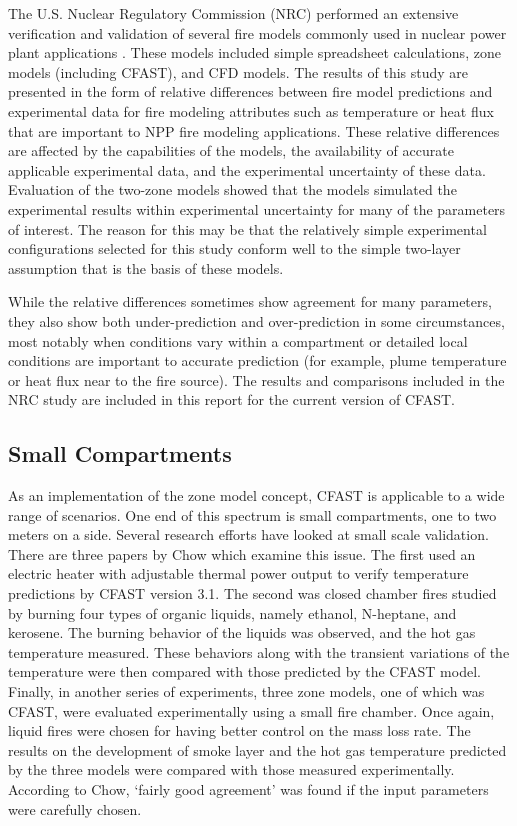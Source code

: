 The U.S. Nuclear Regulatory Commission (NRC) performed an extensive verification and validation of several fire models commonly used in nuclear power plant applications \cite{NRCNUREG1824}.  These models included simple spreadsheet calculations, zone models (including CFAST), and CFD models. The results of this study are presented in the form of relative differences between fire model predictions and experimental data for fire modeling attributes such as temperature or heat flux that are important to NPP fire modeling applications.  These relative differences are affected by the capabilities of the models, the availability of accurate applicable experimental data, and the experimental uncertainty of these data. Evaluation of the two-zone models showed that the models simulated the experimental results within experimental uncertainty  for many of the parameters of interest. The reason for this may be that the relatively simple experimental configurations selected for this study conform well to the simple two-layer assumption that is the basis of these models.

While the relative differences sometimes show agreement for many parameters, they also show both under-prediction and over-prediction in some circumstances, most notably when conditions vary within a compartment or detailed local conditions are important to accurate prediction (for example, plume temperature or heat flux near to the fire source). The results and comparisons included in the NRC study are included in this report for the current version of CFAST.

\subsection{Small Compartments}

As an implementation of the zone model concept, CFAST is applicable to a wide range of scenarios. One end of this spectrum is small compartments, one to two meters on a side. Several research efforts have looked at small scale validation. There are three papers by Chow \cite{Lui:2003,Chow:1995,Chow:1992} which examine this issue. The first used an electric heater with adjustable thermal power output to verify temperature predictions by CFAST version 3.1. The second was closed chamber fires studied by burning four types of organic liquids, namely ethanol, N-heptane, and kerosene. The burning behavior of the liquids was observed, and the hot gas temperature measured. These behaviors along with the transient variations of the temperature were then compared with those predicted by the CFAST model. Finally, in another series of experiments, three zone models, one of which was CFAST, were evaluated experimentally using a small fire chamber. Once again, liquid fires were chosen for having better control on the mass loss rate. The results on the development of smoke layer and the hot gas temperature predicted by the three models were compared with those measured experimentally. According to Chow, `fairly good agreement' was found if the input parameters were carefully chosen.

